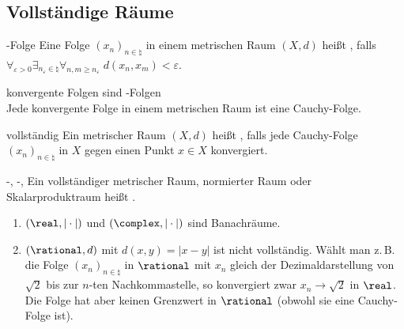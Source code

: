 \pagebreak

\subsection{%
    Vollständige Räume%
}

\begin{Def}{-Folge}
    Eine Folge $(x_n)_{n \in \natural}$ in einem metrischen Raum $(X, d)$ heißt
    , falls
    $\forall_{\varepsilon > 0} \exists_{n_\varepsilon \in \natural}
    \forall_{n, m \ge n_\varepsilon}\; d(x_n, x_m) < \varepsilon$.
\end{Def}

\begin{Lemma}{konvergente Folgen sind -Folgen}\\
    Jede konvergente Folge in einem metrischen Raum ist eine Cauchy-Folge.
\end{Lemma}

\begin{Def}{vollständig}
    Ein metrischer Raum $(X, d)$ heißt , falls jede Cauchy-Folge
    $(x_n)_{n \in \natural}$ in $X$ gegen einen Punkt $x \in X$ konvergiert.
\end{Def}

\begin{Def}{-, -, }
    Ein vollständiger metrischer Raum, normierter Raum oder Skalarproduktraum heißt
    .
\end{Def}

\begin{Bsp}
    \begin{enumerate}[label=\emph{(\alph*)}]
        \item
        $(\real, |\cdot|)$ und $(\complex, |\cdot|)$ sind Banachräume.

        \item
        $(\rational, d)$ mit $d(x, y) = |x - y|$ ist nicht vollständig.
        Wählt man z.\,B. die Folge $(x_n)_{n \in \natural}$ in $\rational$ mit
        $x_n$ gleich der Dezimaldarstellung von $\sqrt{2}$ bis zur $n$-ten Nachkommastelle,
        so konvergiert zwar $x_n \to \sqrt{2}$ in $\real$.
        Die Folge hat aber keinen Grenzwert in $\rational$ (obwohl sie eine Cauchy-Folge ist).
    \end{enumerate}
\end{Bsp}

\linie

